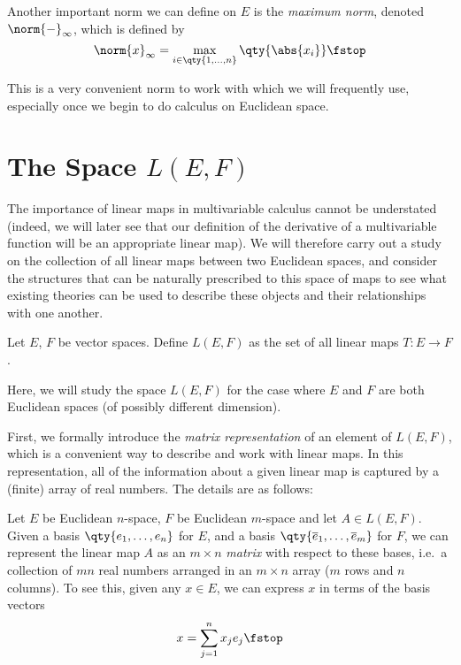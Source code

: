  \vspace{3mm}

 Another important norm we can define on \( E \) is the \emph{maximum norm}, denoted \( \norm{-}_\infty \), which is defined by
 \[ \norm{x}_\infty=\max_{i\in\qty{1,\dots, n}}\qty{\abs{x_i}}\fstop \]

 This is a very convenient norm to work with which we will frequently use, especially once we begin to do calculus on Euclidean space.
 
 \section{The Space \( L(E,F) \)}
 \label{sec:linear-maps}
 The importance of linear maps in multivariable calculus cannot be understated (indeed, we will later see that our definition of the derivative of a multivariable function will be an appropriate linear map). We will therefore carry out a study on the collection of all linear maps between two Euclidean spaces, and consider the structures that can be naturally prescribed to this space of maps to see what existing theories can be used to describe these objects and their relationships with one another.

 \begin{definition}
   Let \( E \), \( F \) be vector spaces. Define \( L(E,F) \) as the set of all linear maps \( T:E\to F \).
 \end{definition}

 Here, we will study the space \( L(E,F) \) for the case where \( E \) and \( F \) are both Euclidean spaces (of possibly different dimension).

 \vspace{3mm}

 First, we formally introduce the \emph{matrix representation} of an element of \( L(E,F) \), which is a convenient way to describe and work with linear maps. In this representation, all of the information about a given linear map is captured by a (finite) array of real numbers. The details are as follows:

 \vspace{3mm}

 Let \( E \) be Euclidean \( n \)-space, \( F \) be Euclidean \( m \)-space and let \( A\in L(E,F) \). Given a basis \( \qty{e_1,\dots, e_n} \) for \( E \), and a basis \( \qty{\overline{e}_1,\dots,\overline{e}_m} \) for \( F \), we can represent the linear map \( A \) as an \( m\times n \) \emph{matrix} with respect to these bases, i.e.\ a collection of \( mn \) real numbers arranged in an \( m\times n \) array (\( m \) rows and \( n \) columns). To see this, given any \( x\in E \), we can express \( x \) in terms of the basis vectors
 \[ x=\sum_{j=1}^nx_je_j\fstop \]

